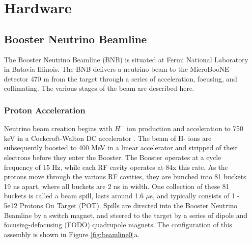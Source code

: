 %

\clearpage
\section{Hardware} \label{sec:hardware}
\subsection{Booster Neutrino Beamline}
The Booster Neutrino Beamline (BNB) is situated at Fermi National Laboratory in Batavia Illinois.  The BNB delivers a neutrino beam to the MicroBooNE detector 470 m from the target through a series of acceleration, focusing, and collimating. The various stages of the beam are described here.  
\subsubsection{Proton Acceleration}
Neutrino beam creation begins with $H^-$ ion production and acceleration to 750 keV in a Cockcroft-Walton DC accelerator \cite{bib:anderson}. The beam of H- ions are subsequently boosted to 400 MeV in a linear accelerator and stripped of their electrons before they enter the Booster.  The Booster operates at a cycle frequency of 15 Hz, while each RF cavity operates at 84x this rate. As the protons move through the various RF cavities, they are bunched into 81 buckets 19 ns apart, where all buckets are 2 ns in width.  One collection of these 81 buckets is called a beam spill, lasts around 1.6 $\mu$s, and typically consists of 1 - 5e12 Protons On Target (POT). Spills are directed into the Booster Neutrino Beamline by a switch magnet, and steered to the target by a series of dipole and focusing-defocusing (FODO) quadrupole magnets.  The configuration of this assembly is shown in Figure \ref{fig:beamline0}a. 
